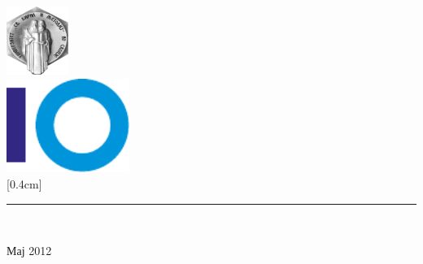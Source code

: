 \begin{titlepage}
\begin{center}
\newcommand{\HRule}{\rule{\linewidth}{0.5mm}}

\includegraphics[width=0.15\textwidth]{images/ukim}\\[1cm]

\includegraphics[width=0.3\textwidth]{images/finki_logo}\\[1cm]

\vfill
\vfill
[0.4cm]

\HRule \\[1.5cm]

\begin{minipage}{0.45\textwidth}
\begin{flushleft} 
\end{flushleft}
\end{minipage}
\begin{minipage}{0.45\textwidth}
\begin{flushright} 
\end{flushright}
\end{minipage}

\vfill

{\large Мај 2012}

\end{center}
\end{titlepage}